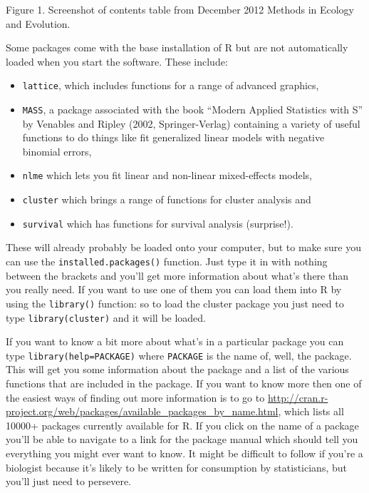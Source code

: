 \documentclass[
]{book}
\providecommand{\tightlist}{%
  \setlength{\itemsep}{0pt}\setlength{\parskip}{0pt}}
\begin{document}
Figure 1. Screenshot of contents table from December 2012 Methods in Ecology and Evolution.

Some packages come with the base installation of R but are not automatically loaded when you start the software. These include:

\begin{itemize}
\tightlist
\item
  \texttt{lattice}, which includes functions for a range of advanced graphics,
\item
  \texttt{MASS}, a package associated with the book ``Modern Applied Statistics with S'' by Venables and Ripley (2002, Springer-Verlag) containing a variety of useful functions to do things like fit generalized linear models with negative binomial errors,
\item
  \texttt{nlme} which lets you fit linear and non-linear mixed-effects models,
\item
  \texttt{cluster} which brings a range of functions for cluster analysis and
\item
  \texttt{survival} which has functions for survival analysis (surprise!).
\end{itemize}

These will already probably be loaded onto your computer, but to make sure you can use the \texttt{installed.packages()} function. Just type it in with nothing between the brackets and you'll get more information about what's there than you really need. If you want to use one of them you can load them into R by using the \texttt{library()} function: so to load the cluster package you just need to type \texttt{library(cluster)} and it will be loaded.

If you want to know a bit more about what's in a particular package you can type \texttt{library(help=PACKAGE)} where \texttt{PACKAGE} is the name of, well, the package. This will get you some information about the package and a list of the various functions that are included in the package. If you want to know more then one of the easiest ways of finding out more information is to go to \url{http://cran.r-project.org/web/packages/available_packages_by_name.html}, which lists all 10000+ packages currently available for R. If you click on the name of a package you'll be able to navigate to a link for the package manual which should tell you everything you might ever want to know. It might be difficult to follow if you're a biologist because it's likely to be written for consumption by statisticians, but you'll just need to persevere.
\end{document}
